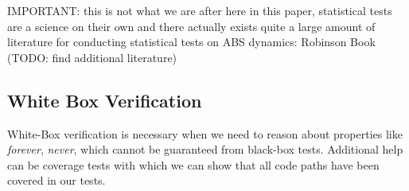IMPORTANT: this is not what we are after here in this paper, statistical tests are a science on their own and there actually exists quite a large amount of literature for conducting statistical tests on ABS dynamics: Robinson Book (TODO: find additional literature)	

\subsection{White Box Verification}
White-Box verification is necessary when we need to reason about properties like \textit{forever}, \textit{never}, which cannot be guaranteed from black-box tests. Additional help can be coverage tests with which we can show that all code paths have been covered in our tests.